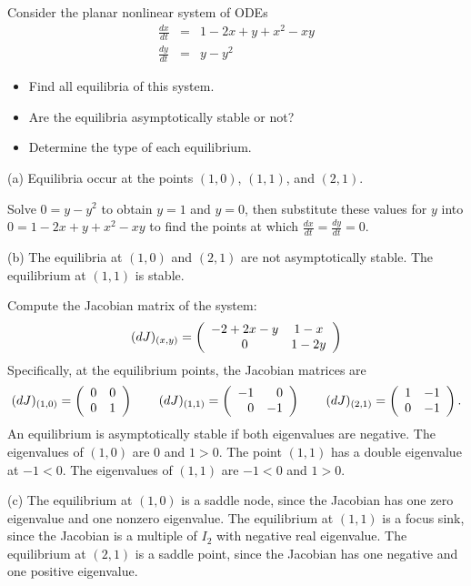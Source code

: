 \documentclass{ximera}
\begin{document}
\begin{exercise} \label{c8.2.6}
Consider the planar nonlinear system of ODEs
\begin{eqnarray*}
\frac{dx}{dt} & = & 1 - 2x + y + x^2 - xy \\
\frac{dy}{dt} & = & y - y^2
\end{eqnarray*}
\begin{itemize}
\item[(a)] Find all equilibria of this system.
\item[(b)] Are the equilibria asymptotically stable or not?
\item[(c)] Determine the type of each equilibrium.
\end{itemize}

\begin{solution}

(a) \ans Equilibria occur at the points $(1,0)$, $(1,1)$, and $(2,1)$.

\soln Solve $0 = y - y^2$ to obtain $y = 1$ and $y = 0$, then substitute
these values for $y$ into $0 = 1 - 2x + y + x^2 - xy$ to find the points
at which $\frac{dx}{dt} = \frac{dy}{dt} = 0$.

(b) \ans The equilibria at $(1,0)$ and $(2,1)$ are not asymptotically
stable.  The equilibrium at $(1,1)$ is stable.

\soln Compute the Jacobian matrix of the system:
\[
(dJ)_{(x,y)} = \left(\begin{array}{cc} -2 + 2x - y & 1 - x\\ 0 &1 - 2y\end{array}\right)
\]
Specifically, at the equilibrium points, the Jacobian matrices are
\[
(dJ)_{(1,0)} = \left(\begin{array}{rr} 0 & 0\\ 0 &1\end{array}\right) \qquad (dJ)_{(1,1)} =
\left(\begin{array}{rr} -1 & 0\\ 0 &-1\end{array}\right) \qquad (dJ)_{(2,1)} = \left(\begin{array}{rr} 1 & -1\\ 0 &-1\end{array}\right).
\]
An equilibrium is asymptotically stable if both eigenvalues are
negative.  The eigenvalues of $(1,0)$ are $0$ and $1 > 0$.
The point $(1,1)$ has a double eigenvalue at $-1 < 0$.
The eigenvalues of $(1,1)$ are $-1 < 0$ and $1 > 0$.

(c) The equilibrium at $(1,0)$ is a saddle node, since the Jacobian
has one zero eigenvalue and one nonzero eigenvalue.  The equilibrium
at $(1,1)$ is a focus sink, since the Jacobian is a multiple of $I_2$
with negative real eigenvalue.  The equilibrium at $(2,1)$ is a
saddle point, since the Jacobian has one negative and one positive
eigenvalue.

\end{solution}
\end{exercise}
\end{document}
